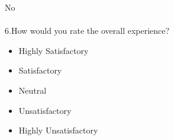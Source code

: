 \documentclass[a5paper]{sdapsclassic}
\begin{document}
\begin{questionnaire}
\begin{flushleft}
		\textcolor{black}{\mycheckbox{}{}}No%
		\\~\\
		6.\hspace{4pt}How would you rate the overall experience?\\
		\begin{itemize}
		\leftskip=14pt
		\item[\hspace{25pt}\textcolor{black}{\mycheckbox{}{}}]Highly Satisfactory
		\item[\textcolor{black}{\mycheckbox{}{}}]Satisfactory
		\item[\textcolor{black}{\mycheckbox{}{}}]Neutral
		\item[\textcolor{black}{\mycheckbox{}{}}]Unsatisfactory
		\item[\textcolor{black}{\mycheckbox{}{}}]Highly Unsatisfactory
		\end{itemize}
		\end{flushleft}
	\end{questionnaire}
\end{document}
